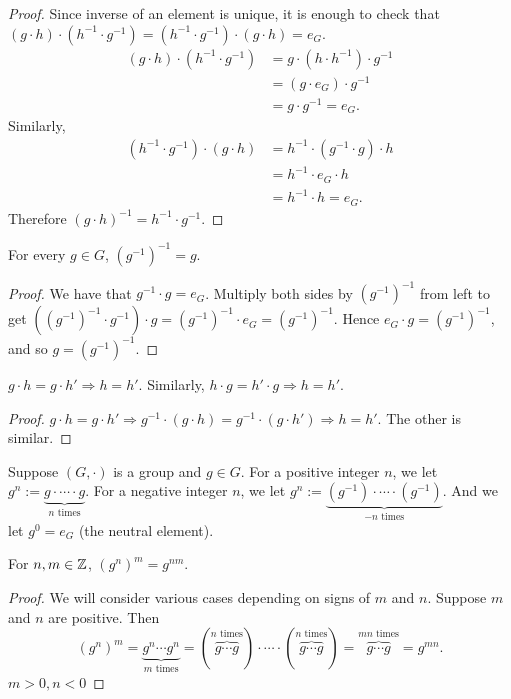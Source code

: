 \begin{proof}
    Since inverse of an element is unique, it is enough to check
    that $(g\cdot h)\cdot (h^{-1}\cdot g^{-1})=(h^{-1}\cdot g^{-1})\cdot (g\cdot h)=e_G$.
    \[\begin{split}
        (g\cdot h)\cdot (h^{-1}\cdot g^{-1})
        &=g\cdot (h\cdot h^{-1})\cdot g^{-1}\\
        &=(g\cdot e_G)\cdot g^{-1}\\
        &=g\cdot g^{-1}=e_G.
    \end{split}\]
    Similarly,
    \[\begin{split}
        (h^{-1}\cdot g^{-1})\cdot (g\cdot h)
        &=h^{-1}\cdot (g^{-1}\cdot g)\cdot h\\
        &=h^{-1}\cdot e_G\cdot h\\
        &=h^{-1}\cdot h=e_G.
    \end{split}\]
    Therefore $(g\cdot h)^{-1}=h^{-1}\cdot g^{-1}$.
\end{proof}

\begin{lemma}
    For every $g\in G$, $(g^{-1})^{-1}=g$.
\end{lemma}

\begin{proof}
    We have that $g^{-1}\cdot g=e_G$. Multiply both sides by $(g^{-1})^{-1}$
    from left to get 
    $\left((g^{-1})^{-1}\cdot g^{-1}\right)\cdot g=(g^{-1})^{-1}\cdot e_G=(g^{-1})^{-1}$.
    Hence $e_G\cdot g=(g^{-1})^{-1}$, and so $g=(g^{-1})^{-1}$.
\end{proof}

\begin{lemma}
    $g\cdot h=g\cdot h'\Rightarrow h=h'$. Similarly,
    $h\cdot g=h'\cdot g\Rightarrow h=h'$.
\end{lemma}

\begin{proof}
    $g\cdot h=g\cdot h'\Rightarrow g^{-1}\cdot (g\cdot h)=g^{-1}\cdot (g\cdot h')\Rightarrow h=h'$.
    The other is similar.
\end{proof}

Suppose $(G,\cdot)$ is a group and $g\in G$. For a positive integer $n$,
we let $g^n:=\underbrace{g\cdot\cdots\cdot g}_{n\text{ times}}$. For a negative 
integer $n$, we let $g^n:=\underbrace{(g^{-1})\cdot\cdots\cdot (g^{-1})}_{-n\text{ times}}$.
And we let $g^0=e_G$ (the neutral element).

\begin{lemma}
    For $n,m\in\mathbb{Z}$, $(g^n)^m=g^{nm}$.
\end{lemma}

\begin{proof}
    We will consider various cases depending on signs of $m$ and $n$.
    Suppose $m$ and $n$ are positive. Then 
    \[(g^n)^m=\underbrace{g^n\cdots g^n}_{m\text{ times}}=(\overbrace{g\cdots g}^{n\text{ times}})\cdot\cdots\cdot(\overbrace{g\cdots g}^{n\text{ times}})=\overbrace{g\cdots g}^{mn\text{ times}}=g^{mn}.\]
    $m>0,n<0$
\end{proof}